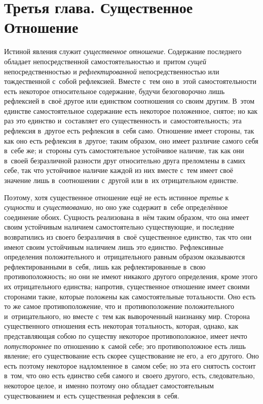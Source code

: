 \chapter[{\em Третья глава} Существенное Отношение]
{Третья глава. Существенное Отношение}

Истиной явления служит {\em существенное отношение}. Содержание последнего
обладает непосредственной самостоятельностью и~притом {\em сущей}
непосредственностью и {\em рефлектированной} непосредственностью или
тождественной с~собой рефлексией. Вместе с~тем оно в~этой самостоятельности
есть некоторое относительное содержание, будучи безоговорочно лишь
рефлексией в~своё другое или единством соотношения со своим другим. В~этом
единстве самостоятельное содержание есть некоторое положенное, снятое; но
как раз это единство и~составляет его существенность и~самостоятельность;
эта рефлексия в~другое есть рефлексия в~себя само. Отношение имеет стороны,
так как оно есть рефлексия в~другое; таким образом, оно имеет различие
самого себя в~себе же; и~стороны суть самостоятельное устойчивое наличие,
так как они в~своей безразличной разности друг относительно друга преломлены
в самих себе, так что устойчивое наличие каждой из них вместе с~тем имеет
своё значение лишь в~соотношении с~другой или в~их отрицательном единстве.

Поэтому, хотя существенное отношение ещё не есть истинное {\em третье}
к {\em сущности} и {\em существованию,} но оно уже содержит в~себе
определённое соединение обоих. Сущность реализована в~нём таким образом,
что она имеет своим устойчивым наличием самостоятельно существующие, и
последние возвратились из своего безразличия в~своё существенное единство,
так что они имеют своим устойчивым наличием лишь это единство. Рефлексивные
определения положительного и~отрицательного равным образом оказываются
рефлектированными в~себя, лишь как рефлектированные в~свою
противоположность; но они не имеют никакого другого определения, кроме
этого их отрицательного единства; напротив, существенное отношение имеет
своими сторонами такие, которые положены как самостоятельные тотальности.
Оно есть то же самое противоположение, что и~противоположение
положительного и~отрицательного, но вместе с~тем как вывороченный наизнанку
мир. Сторона существенного отношения есть некоторая тотальность, которая,
однако, как представляющая собою по существу некоторое противоположное,
имеет нечто {\em потустороннее} по отношению к~самой
себе; эго противоположное есть лишь явление; его существование есть скорее
существование не его, а~его другого. Оно есть поэтому некоторое
надломленное в~самом себе; но эта его снятость состоит в~том, что оно есть
единство себя самого и~своего другого, есть, следовательно, некоторое
целое, и~именно поэтому оно обладает самостоятельным существованием и~есть
существенная рефлексия в~себя.

